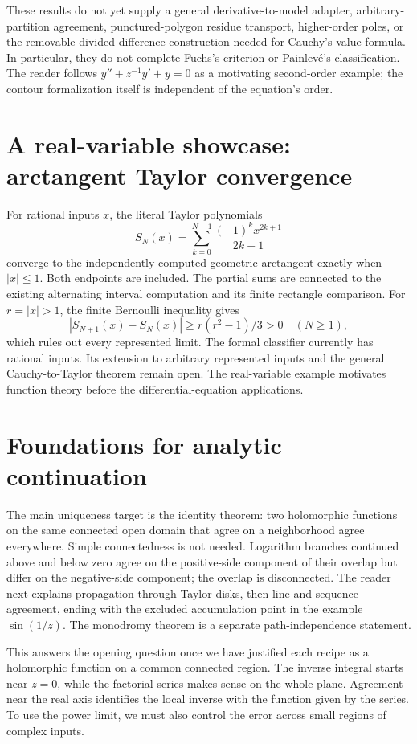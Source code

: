 These results do not yet supply a general derivative-to-model adapter,
arbitrary-partition agreement, punctured-polygon residue transport,
higher-order poles, or the removable divided-difference construction needed
for Cauchy's value formula. In particular, they do not complete Fuchs's
criterion or Painlev\'e's classification. The reader follows
$y''+z^{-1}y'+y=0$ as a motivating second-order example; the contour
formalization itself is independent of the equation's order.


\section{A real-variable showcase: arctangent Taylor convergence}
For rational inputs $x$, the literal Taylor polynomials
\[
 S_N(x)=\sum_{k=0}^{N-1}\frac{(-1)^k x^{2k+1}}{2k+1}
\]
converge to the independently computed geometric arctangent exactly when
$|x|\le1$. Both endpoints are included. The partial sums are connected to the
existing alternating interval computation and its finite rectangle comparison.
For $r=|x|>1$, the finite Bernoulli inequality gives
\[
 |S_{N+1}(x)-S_N(x)|\ge r(r^2-1)/3>0\quad(N\ge1),
\]
which rules out every represented limit. The formal classifier currently has
rational inputs. Its extension to arbitrary represented inputs and the general
Cauchy-to-Taylor theorem remain open. The real-variable example motivates
function theory before the differential-equation applications.


\section{Foundations for analytic continuation}
\label{sec:continuation-foundation}

The main uniqueness target is the identity theorem: two holomorphic
functions on the same connected open domain that agree on a neighborhood
agree everywhere. Simple connectedness is not needed. Logarithm branches
continued above and below zero agree on the positive-side component of
their overlap but differ on the negative-side component; the overlap is
disconnected. The reader next explains propagation through Taylor disks,
then line and sequence agreement, ending with the excluded accumulation
point in the example $\sin(1/z)$. The monodromy theorem is a separate
path-independence statement.

This answers the opening question once we have justified each recipe as a
holomorphic function on a common connected region. The inverse integral
starts near $z=0$, while the factorial series makes sense on the whole
plane. Agreement near the real axis identifies the local inverse with the
function given by the series. To use the power limit, we must also control
the error across small regions of complex inputs.

